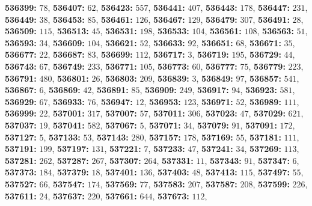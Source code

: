 \textsf{\bfseries 536399:} $78$, \textsf{\bfseries 536407:} $62$, \textsf{\bfseries 536423:} $557$, \textsf{\bfseries 536441:} $407$, \textsf{\bfseries 536443:} $178$, \textsf{\bfseries 536447:} $231$, \textsf{\bfseries 536449:} $38$, \textsf{\bfseries 536453:} $85$, \textsf{\bfseries 536461:} $126$, \textsf{\bfseries 536467:} $129$, \textsf{\bfseries 536479:} $307$, \textsf{\bfseries 536491:} $28$, \textsf{\bfseries 536509:} $115$, \textsf{\bfseries 536513:} $45$, \textsf{\bfseries 536531:} $198$, \textsf{\bfseries 536533:} $104$, \textsf{\bfseries 536561:} $108$, \textsf{\bfseries 536563:} $51$, \textsf{\bfseries 536593:} $34$, \textsf{\bfseries 536609:} $104$, \textsf{\bfseries 536621:} $52$, \textsf{\bfseries 536633:} $92$, \textsf{\bfseries 536651:} $68$, \textsf{\bfseries 536671:} $35$, \textsf{\bfseries 536677:} $22$, \textsf{\bfseries 536687:} $83$, \textsf{\bfseries 536699:} $112$, \textsf{\bfseries 536717:} $3$, \textsf{\bfseries 536719:} $195$, \textsf{\bfseries 536729:} $44$, \textsf{\bfseries 536743:} $67$, \textsf{\bfseries 536749:} $233$, \textsf{\bfseries 536771:} $105$, \textsf{\bfseries 536773:} $60$, \textsf{\bfseries 536777:} $75$, \textsf{\bfseries 536779:} $223$, \textsf{\bfseries 536791:} $480$, \textsf{\bfseries 536801:} $26$, \textsf{\bfseries 536803:} $209$, \textsf{\bfseries 536839:} $3$, \textsf{\bfseries 536849:} $97$, \textsf{\bfseries 536857:} $541$, \textsf{\bfseries 536867:} $6$, \textsf{\bfseries 536869:} $42$, \textsf{\bfseries 536891:} $85$, \textsf{\bfseries 536909:} $249$, \textsf{\bfseries 536917:} $94$, \textsf{\bfseries 536923:} $581$, \textsf{\bfseries 536929:} $67$, \textsf{\bfseries 536933:} $76$, \textsf{\bfseries 536947:} $12$, \textsf{\bfseries 536953:} $123$, \textsf{\bfseries 536971:} $52$, \textsf{\bfseries 536989:} $111$, \textsf{\bfseries 536999:} $22$, \textsf{\bfseries 537001:} $317$, \textsf{\bfseries 537007:} $57$, \textsf{\bfseries 537011:} $306$, \textsf{\bfseries 537023:} $47$, \textsf{\bfseries 537029:} $621$, \textsf{\bfseries 537037:} $19$, \textsf{\bfseries 537041:} $582$, \textsf{\bfseries 537067:} $5$, \textsf{\bfseries 537071:} $34$, \textsf{\bfseries 537079:} $91$, \textsf{\bfseries 537091:} $172$, \textsf{\bfseries 537127:} $5$, \textsf{\bfseries 537133:} $53$, \textsf{\bfseries 537143:} $280$, \textsf{\bfseries 537157:} $178$, \textsf{\bfseries 537169:} $55$, \textsf{\bfseries 537181:} $111$, \textsf{\bfseries 537191:} $199$, \textsf{\bfseries 537197:} $131$, \textsf{\bfseries 537221:} $7$, \textsf{\bfseries 537233:} $47$, \textsf{\bfseries 537241:} $34$, \textsf{\bfseries 537269:} $113$, \textsf{\bfseries 537281:} $262$, \textsf{\bfseries 537287:} $267$, \textsf{\bfseries 537307:} $264$, \textsf{\bfseries 537331:} $11$, \textsf{\bfseries 537343:} $91$, \textsf{\bfseries 537347:} $6$, \textsf{\bfseries 537373:} $184$, \textsf{\bfseries 537379:} $18$, \textsf{\bfseries 537401:} $136$, \textsf{\bfseries 537403:} $48$, \textsf{\bfseries 537413:} $115$, \textsf{\bfseries 537497:} $55$, \textsf{\bfseries 537527:} $66$, \textsf{\bfseries 537547:} $174$, \textsf{\bfseries 537569:} $77$, \textsf{\bfseries 537583:} $207$, \textsf{\bfseries 537587:} $208$, \textsf{\bfseries 537599:} $226$, \textsf{\bfseries 537611:} $24$, \textsf{\bfseries 537637:} $220$, \textsf{\bfseries 537661:} $644$, \textsf{\bfseries 537673:} $112$, 
